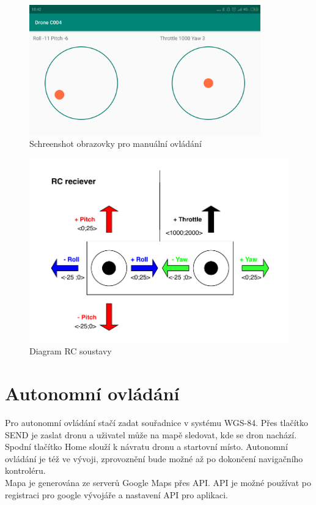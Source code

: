 \begin{figure}[H]
	\centering
	\includegraphics[width=10cm]{pictures/app.png}
	\caption{Schreenshot obrazovky pro manuální ovládání}
\end{figure}

\begin{figure}[H]
	\centering
	\includegraphics[width=14cm]{pictures/rcDiagram.pdf}
	\caption{Diagram RC soustavy}
\end{figure}

\section{Autonomní ovládání} 
Pro autonomní ovládání stačí zadat souřadnice v systému WGS-84. Přes tlačítko SEND je zaslat dronu a uživatel může na mapě sledovat, kde se dron nachází. Spodní tlačítko Home slouží k návratu dronu a startovní místo. Autonomní ovládání je též ve vývoji, zprovoznění bude možné až po dokončení navigačního kontroléru.\\
Mapa je generována ze serverů Google Maps přes API. API je možné používat po registraci pro google vývojáře a nastavení API pro aplikaci.\\


